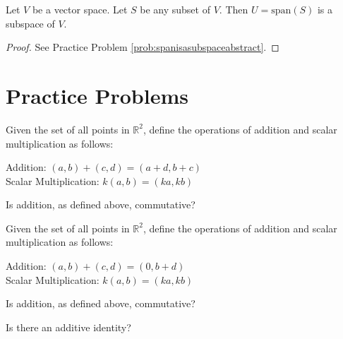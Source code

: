\documentclass{ximera}
\begin{document}
\begin{theorem}\label{th:spanisasubspaceabstract}
Let $V$ be a vector space.  Let $S$ be any subset of $V$.  Then $U=\mbox{span}(S)$ is a subspace of $V$.
\end{theorem}
\begin{proof}
See Practice Problem \ref{prob:spanisasubspaceabstract}.
\end{proof}

\section*{Practice Problems}


  \begin{problem}\label{prob:abstractvectspace1}
Given the set of all points in $\mathbb{R}^2$, define the operations of addition and scalar multiplication as follows:
  
  Addition: $(a, b)+(c, d)=(a+d, b+c)$\\ Scalar Multiplication: $k(a, b)=(ka, kb)$

  Is addition, as defined above, commutative?
  \begin{multipleChoice}
  \end{multipleChoice}
  \end{problem}
  
  \begin{problem}\label{prob:abstractvectspace2} Given the set of all points in $\mathbb{R}^2$, define the operations of addition and scalar multiplication as follows:
  
  Addition: $(a, b)+(c, d)=(0, b+d)$\\ Scalar Multiplication: $k(a, b)=(ka, kb)$

  Is addition, as defined above, commutative?
  \begin{multipleChoice}
  \end{multipleChoice}

Is there an additive identity?
  \begin{multipleChoice}
  \end{multipleChoice}
  
  \end{problem}
  
\end{document}
